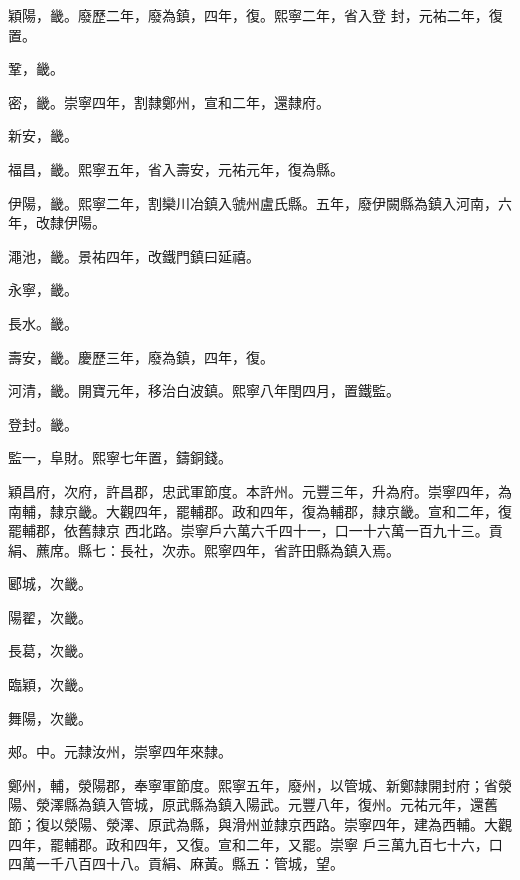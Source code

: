 \begin{pinyinscope}
 穎陽，畿。廢歷二年，廢為鎮，四年，復。熙寧二年，省入登
 封，元祐二年，復置。



 鞏，畿。



 密，畿。崇寧四年，割隸鄭州，宣和二年，還隸府。



 新安，畿。



 福昌，畿。熙寧五年，省入壽安，元祐元年，復為縣。



 伊陽，畿。熙寧二年，割欒川冶鎮入虢州盧氏縣。五年，廢伊闕縣為鎮入河南，六年，改隸伊陽。



 澠池，畿。景祐四年，改鐵門鎮曰延禧。



 永寧，畿。



 長水。畿。



 壽安，畿。慶歷三年，廢為鎮，四年，復。



 河清，畿。開寶元年，移治白波鎮。熙寧八年閏四月，置鐵監。



 登封。畿。



 監一，阜財。熙寧七年置，鑄銅錢。



 穎昌府，次府，許昌郡，忠武軍節度。本許州。元豐三年，升為府。崇寧四年，為南輔，隸京畿。大觀四年，罷輔郡。政和四年，復為輔郡，隸京畿。宣和二年，復罷輔郡，依舊隸京
 西北路。崇寧戶六萬六千四十一，口一十六萬一百九十三。貢絹、藨席。縣七：長社，次赤。熙寧四年，省許田縣為鎮入焉。



 郾城，次畿。



 陽翟，次畿。



 長葛，次畿。



 臨穎，次畿。



 舞陽，次畿。



 郟。中。元隸汝州，崇寧四年來隸。



 鄭州，輔，滎陽郡，奉寧軍節度。熙寧五年，廢州，以管城、新鄭隸開封府；省滎陽、滎澤縣為鎮入管城，原武縣為鎮入陽武。元豐八年，復州。元祐元年，還舊節；復以滎陽、滎澤、原武為縣，與滑州並隸京西路。崇寧四年，建為西輔。大觀四年，罷輔郡。政和四年，又復。宣和二年，又罷。崇寧
 戶三萬九百七十六，口四萬一千八百四十八。貢絹、麻黃。縣五：管城，望。




\end{pinyinscope}
